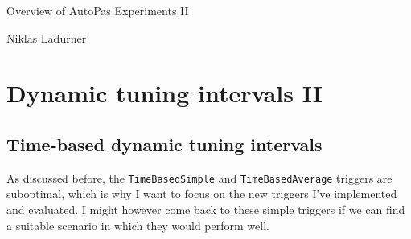 \documentclass[]{article}
\newcommand{\msubtitle}{Overview of AutoPas Experiments II}
\newcommand{\mauthor}{Niklas Ladurner}
\begin{document}
\begin{center}\LARGE\msubtitle\end{center}
\begin{center}\normalsize\mauthor\end{center}


\section{Dynamic tuning intervals II}
\subsection{Time-based dynamic tuning intervals}

As discussed before, the \texttt{TimeBasedSimple} and \texttt{TimeBasedAverage} triggers are suboptimal, which is why I want to focus on the new triggers I've implemented and evaluated. I might however come back to these simple triggers if we can find a suitable scenario in which they would perform well.
\end{document}
